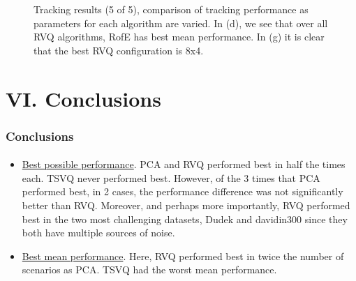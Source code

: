 \begin{frame}
\begin{figure}[h!]
\caption{Tracking results (5 of 5), comparison of tracking performance as parameters for each algorithm are varied.  In (d), we see that over all RVQ algorithms, RofE has best mean performance.  In (g) it is clear that the best RVQ configuration is 8x4.}
\label{fig:results_final_5_configs}
\end{figure}
\end{frame}

\section{VI. Conclusions}
\begin{frame}
\frametitle{Conclusions}
\framesubtitle{}
\logoCSIPCPL\mypagenum
\begin{itemize}
\item \underline{Best possible performance}.  PCA and RVQ performed best in half the times each.  TSVQ never performed best.  However, of the 3 times that PCA performed best, in 2 cases, the performance difference was not significantly better than RVQ.  Moreover, and perhaps more importantly, RVQ performed best in the two most challenging datasets, Dudek and davidin300 since they both have multiple sources of noise.
\item \underline{Best mean performance}.  Here, RVQ performed best in twice the number of scenarios as PCA.  TSVQ had the worst mean performance.
\end{itemize}
\end{frame}

